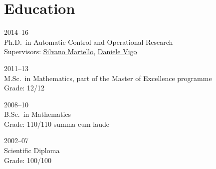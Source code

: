 \section*{Education}

\begin{paracol}{2}
  \textsc{2014--16}
\switchcolumn
  \\
  Ph.D.\ in Automatic Control and Operational Research\\
  Supervisors: \href{https://scholar.google.com/citations?user=o4a20zsAAAAJ}{Silvano Martello}, \href{https://scholar.google.com/citations?user=2kk8d_AAAAAJ}{Daniele Vigo}
\end{paracol}

\begin{paracol}{2}
  \textsc{2011--13}
\switchcolumn
  \\
  M.Sc.\ in Mathematics, part of the Master of Excellence programme\\
  Grade: 12/12
\end{paracol}

\begin{paracol}{2}
  \textsc{2008--10}
\switchcolumn
  \\
  B.Sc.\ in Mathematics\\
  Grade: 110/110 summa cum laude
\end{paracol}

\begin{paracol}{2}
  \textsc{2002--07}
\switchcolumn
  \\
  Scientific Diploma\\
  Grade: 100/100
\end{paracol}
